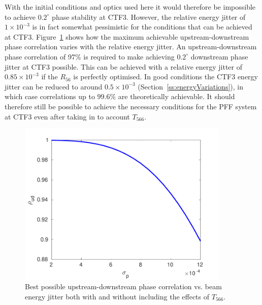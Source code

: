 With the initial conditions and optics used here it would therefore be impossible to achieve \(0.2^\circ\) phase stability at CTF3. However, the relative energy jitter of \(1\times10^{-3}\) is in fact somewhat pessimistic for the conditions that can be achieved at CTF3. Figure~\ref{f:maxCorrWithT566} shows how the maximum achievable upstream-downstream phase correlation varies with the relative energy jitter. An upstream-downstream phase correlation of 97\% is required to make achieving \(0.2^\circ\) downstream phase jitter at CTF3 possible. This can be achieved with a relative energy jitter of \(0.85\times10^{-3}\) if the \(R_{56}\) is perfectly optimised. In good conditions the CTF3 energy jitter can be reduced to around \(0.5\times10^{-3}\) (Section~\ref{ss:energyVariations}), in which case correlations up to \(99.6\%\) are theoretically achievable. It should therefore still be possible to achieve the necessary conditions for the PFF system at CTF3 even after taking in to account \(T_{566}\).

\begin{figure}
  \centering
  \includegraphics[width=0.9\textwidth]{Figures/propagation/maxCorrWithT566}
  \caption{Best possible upstream-downstream phase correlation vs. beam energy jitter both with and without including the effects of \(T_{566}\).}
  \label{f:maxCorrWithT566}
\end{figure}

